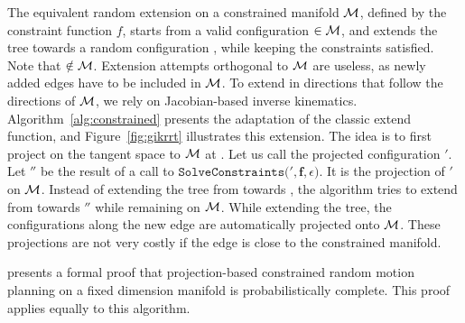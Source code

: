 The equivalent random extension on a constrained manifold $\mathcal{M}$,
defined by the constraint function $f$, starts from a valid
configuration {} $ \in \mathcal{M}$, and extends the tree
towards a random configuration , while keeping the
constraints satisfied. Note that {} $ \notin\mathcal{M}$.
Extension attempts orthogonal to $\mathcal{M}$ are useless, as newly
added edges have to be included in $\mathcal{M}$. To extend in
directions that follow the directions of $\mathcal{M}$, we rely on
Jacobian-based inverse kinematics. Algorithm~\ref{alg:constrained}
presents the adaptation of the classic extend function, and
Figure~\ref{fig:gikrrt} illustrates this extension. The idea is to
first project  on the tangent space to $\mathcal{M}$ at
. Let us call the projected configuration
$'$. Let $''$ be the result of a call to
$\texttt{SolveConstraints}($$',\mathbf{f},\epsilon)$.  It
is the projection of $'$ on $\mathcal{M}$. Instead of
extending the tree from  towards , the
algorithm tries to extend from  towards $''$
while remaining on $\mathcal{M}$. While extending the tree, the
configurations along the new edge are automatically projected onto
$\mathcal{M}$. These projections are not very costly if the edge is
close to the constrained manifold.

\cite{berenson2011task} presents a formal proof that projection-based
constrained random motion planning on a fixed dimension manifold is
probabilistically complete. This proof applies equally to this
algorithm.

